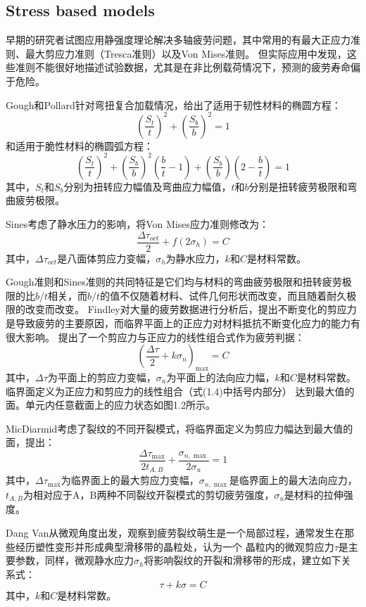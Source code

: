 \subsection{Stress based models}
早期的研究者试图应用静强度理论解决多轴疲劳问题，其中常用的有最大正应力准则、最大剪应力准则（Tresca准则）以及Von Mises准则。
但实际应用中发现，这些准则不能很好地描述试验数据，尤其是在非比例载荷情况下，预测的疲劳寿命偏于危险。


Gough和Pollard\cite{gough1935strength}\cite{gough1936properties}针对弯扭复合加载情况，给出了适用于韧性材料的椭圆方程：
\[{\left( {\frac{{{S_t}}}{t}} \right)^2} + {\left( {\frac{{{S_b}}}{b}} \right)^2} = 1\]
和适用于脆性材料的椭圆弧方程：
\[{\left( {\frac{{{S_t}}}{t}} \right)^2} + {\left( {\frac{{{S_b}}}{b}} \right)^2}\left( {\frac{b}{t} - 1} \right) + \left( {\frac{{{S_b}}}{b}} \right)\left( {2 - \frac{b}{t}} \right) = 1\]
其中，${S_t}$和${S_b}$分别为扭转应力幅值及弯曲应力幅值，$t$和$b$分别是扭转疲劳极限和弯曲疲劳极限。

Sines\cite{sines1959behavior}考虑了静水压力的影响，将Von Mises应力准则修改为：
\[\frac{{\Delta {\tau _{oct}}}}{2} + f\left( {2{\sigma _h}} \right) = C\]
其中，${\Delta {\tau _{oct}}}$是八面体剪应力变幅，${\sigma _h}$为静水应力，$k$和$C$是材料常数。

Gough准则和Sines准则的共同特征是它们均与材料的弯曲疲劳极限和扭转疲劳极限的比$b/t$相关，而$b/t$的值不仅随着材料、试件几何形状而改变，而且随着耐久极限的改变而改变。
Findley\cite{findley1953combined}\cite{findley1954modified}\cite{findley1956theory}\cite{findley1958theory}对大量的疲劳数据进行分析后，提出不断变化的剪应力是导致疲劳的主要原因，而临界平面上的正应力对材料抵抗不断变化应力的能力有很大影响。
提出了一个剪应力与正应力的线性组合式作为疲劳判据：
\[{\left( {\frac{{\Delta \tau }}{2} + k{\sigma _n}} \right)_{\max }} = C\]
其中，${\Delta \tau }$为平面上的剪应力变幅，${\sigma _n}$为平面上的法向应力幅，$k$和$C$是材料常数。
临界面定义为正应力和剪应力的线性组合（式(1.4)中括号内部分）
达到最大值的面。单元内任意截面上的应力状态如图1.2所示。

MicDiarmid\cite{mcdiarmid1991general}考虑了裂纹的不同开裂模式，将临界面定义为剪应力幅达到最大值的面，提出：
\[\frac{{\Delta {\tau _{\max }}}}{{2{t_{A,B}}}} + \frac{{{\sigma _{n,\max }}}}{{2{\sigma _u}}} = 1\]
其中，${\Delta {\tau _{\max }}}$为临界面上的最大剪应力变幅，${\sigma _{n,\max }}$是临界面上的最大法向应力，${t_{A,B}}$为相对应于A，B两种不同裂纹开裂模式的剪切疲劳强度，${\sigma _u}$是材料的拉伸强度。

Dang Van\cite{van1986criterion}\cite{van1999introduction}从微观角度出发，观察到疲劳裂纹萌生是一个局部过程，通常发生在那些经历塑性变形并形成典型滑移带的晶粒处，认为一个
晶粒内的微观剪应力$\tau$是主要参数，同样，微观静水应力$\sigma_h$将影响裂纹的开裂和滑移带的形成，建立如下关系式：
\[\tau  + k\sigma  = C\]
其中，$k$和$C$是材料常数。

